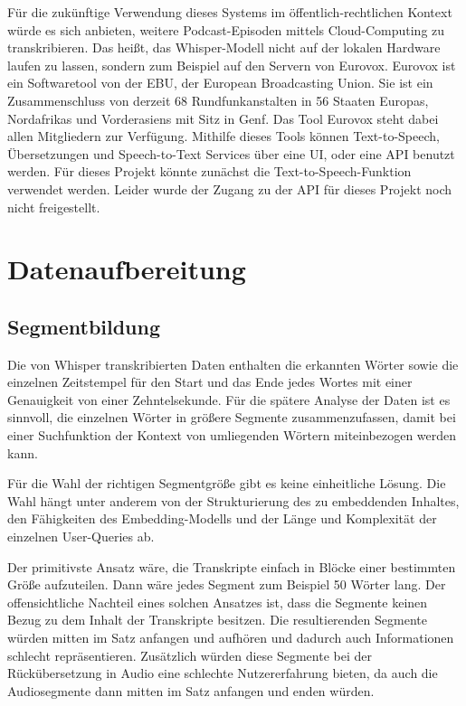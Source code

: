 Für die zukünftige Verwendung dieses Systems im öffentlich-rechtlichen Kontext würde es sich anbieten, weitere Podcast-Episoden mittels Cloud-Computing zu transkribieren.
Das heißt, das Whisper-Modell nicht auf der lokalen Hardware laufen zu lassen, sondern zum Beispiel auf den Servern von Eurovox.
Eurovox ist ein Softwaretool von der EBU, der European Broadcasting Union.
Sie ist ein Zusammenschluss von derzeit 68 Rundfunkanstalten in 56 Staaten Europas, Nordafrikas und Vorderasiens mit Sitz in Genf.
Das Tool Eurovox steht dabei allen Mitgliedern zur Verfügung.
Mithilfe dieses Tools können Text-to-Speech, Übersetzungen und Speech-to-Text Services über eine UI, oder eine API benutzt werden.
Für dieses Projekt könnte zunächst die Text-to-Speech-Funktion verwendet werden.
Leider wurde der Zugang zu der API für dieses Projekt noch nicht freigestellt.~\cite{eurovox2024}

\section{Datenaufbereitung}

\subsection{Segmentbildung}

Die von Whisper transkribierten Daten enthalten die erkannten Wörter sowie die einzelnen Zeitstempel für den Start und das Ende jedes Wortes mit einer Genauigkeit von einer Zehntelsekunde.
Für die spätere Analyse der Daten ist es sinnvoll, die einzelnen Wörter in größere Segmente zusammenzufassen, damit bei einer Suchfunktion der Kontext von umliegenden Wörtern miteinbezogen werden kann.

Für die Wahl der richtigen Segmentgröße gibt es keine einheitliche Lösung.
Die Wahl hängt unter anderem von der Strukturierung des zu embeddenden Inhaltes, den Fähigkeiten des Embedding-Modells und der Länge und Komplexität der einzelnen User-Queries ab.

Der primitivste Ansatz wäre, die Transkripte einfach in Blöcke einer bestimmten Größe aufzuteilen.
Dann wäre jedes Segment zum Beispiel 50 Wörter lang.
Der offensichtliche Nachteil eines solchen Ansatzes ist, dass die Segmente keinen Bezug zu dem Inhalt der Transkripte besitzen.
Die resultierenden Segmente würden mitten im Satz anfangen und aufhören und dadurch auch Informationen schlecht repräsentieren.
Zusätzlich würden diese Segmente bei der Rückübersetzung in Audio eine schlechte Nutzererfahrung bieten, da auch die Audiosegmente dann mitten im Satz anfangen und enden würden.

